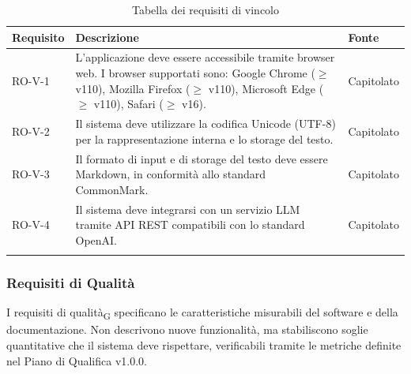 \documentclass[11pt,a4paper]{article}
\begin{document}
\begin{longtable}{|p{}|>{
  \raggedright\arraybackslash}p{}|p{}|}
\hline
\textbf{Requisito} & \textbf{Descrizione} & \textbf{Fonte} \\
\hline
RO-V-1 & L'applicazione deve essere accessibile tramite browser web. 
I browser supportati sono: Google Chrome ($\geq$ v110), Mozilla Firefox 
($\geq$ v110), Microsoft Edge ($\geq$ v110), Safari ($\geq$ v16). & Capitolato \\
\hline
RO-V-2 & Il sistema deve utilizzare la codifica Unicode (UTF-8) per la rappresentazione interna e lo storage del testo. & Capitolato \\
\hline
RO-V-3 & Il formato di input e di storage del testo deve essere Markdown, in conformità allo standard CommonMark. & Capitolato \\
\hline
RO-V-4 & Il sistema deve integrarsi con un servizio LLM tramite API REST compatibili con lo standard OpenAI. & Capitolato \\
\hline
\addlinespace[1em]
\caption{Tabella dei requisiti di vincolo}
\end{longtable}

\newpage

\subsubsection{Requisiti di Qualità}
I requisiti di qualità\textsubscript{G} specificano le caratteristiche 
misurabili del software e della documentazione. Non descrivono nuove 
funzionalità, ma stabiliscono soglie quantitative che il sistema deve 
rispettare, verificabili tramite le metriche definite nel 
Piano di Qualifica v1.0.0.
\end{document}
